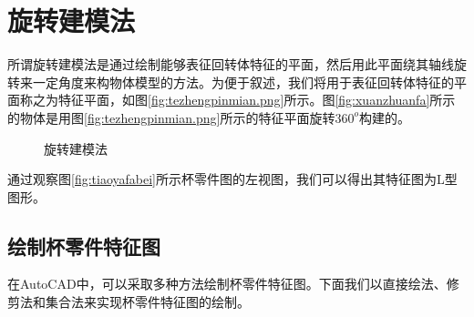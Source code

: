 \section{旋转建模法}
所谓旋转建模法是通过绘制能够表征回转体特征的平面，然后用此平面绕其轴线旋转来一定角度来构物体模型的方法。为便于叙述，我们将用于表征回转体特征的平面称之为特征平面，如图\ref{fig:tezhengpinmian.png}所示。图\ref{fig:xuanzhuanfa}所示的物体是用图\ref{fig:tezhengpinmian.png}所示的特征平面旋转$360^o$构建的。
\begin{figure}[htbp]
\hspace{20pt}
\caption{旋转建模法}
\end{figure}
通过观察图\ref{fig:tiaoyafabei}所示杯零件图的左视图，我们可以得出其特征图为L型图形。
\subsection{绘制杯零件特征图}\label{sec:beilingjiantezheng}
在AutoCAD中，可以采取多种方法绘制杯零件特征图。下面我们以直接绘法、修剪法和集合法来实现杯零件特征图的绘制。
